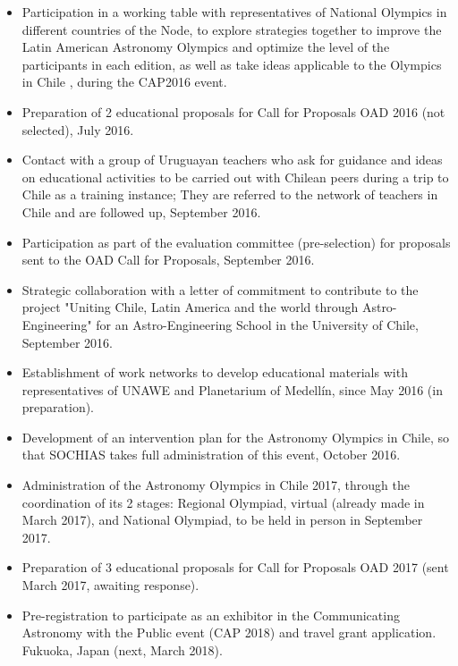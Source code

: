 \begin{itemize}
    \item Participation in a working table with representatives of National Olympics in different countries of the Node, to explore strategies together to improve the Latin American Astronomy Olympics and optimize the level of the participants in each edition, as well as take ideas applicable to the Olympics in Chile , during the CAP2016 event.

    \item Preparation of 2 educational proposals for Call for Proposals OAD 2016 (not selected), July 2016.

    \item Contact with a group of Uruguayan teachers who ask for guidance and ideas on educational activities to be carried out with Chilean peers during a trip to Chile as a training instance; They are referred to the network of teachers in Chile and are followed up, September 2016.

    \item Participation as part of the evaluation committee (pre-selection) for proposals sent to the OAD Call for Proposals, September 2016.

    \item Strategic collaboration with a letter of commitment to contribute to the project "Uniting Chile, Latin America and the world through Astro-Engineering" for an Astro-Engineering School in the University of Chile, September 2016.

    \item Establishment of work networks to develop educational materials with representatives of UNAWE and Planetarium of Medellín, since May 2016 (in preparation).

    \item Development of an intervention plan for the Astronomy Olympics in Chile, so that SOCHIAS takes full administration of this event, October 2016.

    \item Administration of the Astronomy Olympics in Chile 2017, through the coordination of its 2 stages: Regional Olympiad, virtual (already made in March 2017), and National Olympiad, to be held in person in September 2017.

    \item Preparation of 3 educational proposals for Call for Proposals OAD 2017 (sent March 2017, awaiting response).

    \item Pre-registration to participate as an exhibitor in the Communicating Astronomy with the Public event (CAP 2018) and travel grant application. Fukuoka, Japan (next, March 2018).


\end{itemize}
